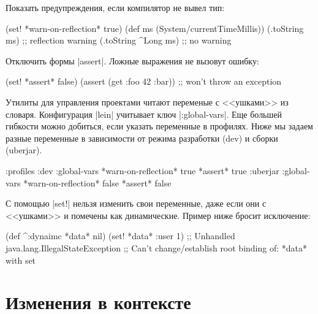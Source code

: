 Показать предупреждения, если компилятор не вывел тип:

\begin{english}
  \begin{clojure}
(set! *warn-on-reflection* true)
(def ms (System/currentTimeMillis))
(.toString ms)       ;; reflection warning
(.toString ^Long ms) ;; no warning
  \end{clojure}
\end{english}

Отключить формы \spverb|assert|. Ложные выражения не вызовут ошибку:

\begin{english}
  \begin{clojure}
(set! *assert* false)
(assert (get {:foo 42} :bar))
;; won't throw an exception
  \end{clojure}
\end{english}

Утилиты для управления проектами читают переменые с <<ушками>> из
словаря. Конфигурация \spverb|lein| учитывает ключ \spverb|:global-vars|. Еще
большей гибкости можно добиться, если указать переменные в профилях. Ниже мы
задаем разные переменные в зависимости от режима разработки (dev) и сборки
(uberjar).

\begin{english}
  \begin{clojure}
{:profiles
 :dev {:global-vars {*warn-on-reflection* true
                     *assert* true}}
 :uberjar {:global-vars {*warn-on-reflection* false
                         *assert* false}}}
  \end{clojure}
\end{english}

С помощью \spverb|set!| нельзя изменить свои переменные, даже если они с
<<ушками>> и помечены как динамические. Пример ниже бросит исключение:

\begin{english}
  \begin{clojure}
(def ^:dynaimc *data* nil)
(set! *data* {:user 1})
;; Unhandled java.lang.IllegalStateException
;; Can't change/establish root binding of: *data* with set
  \end{clojure}
\end{english}

\section{Изменения в контексте}

